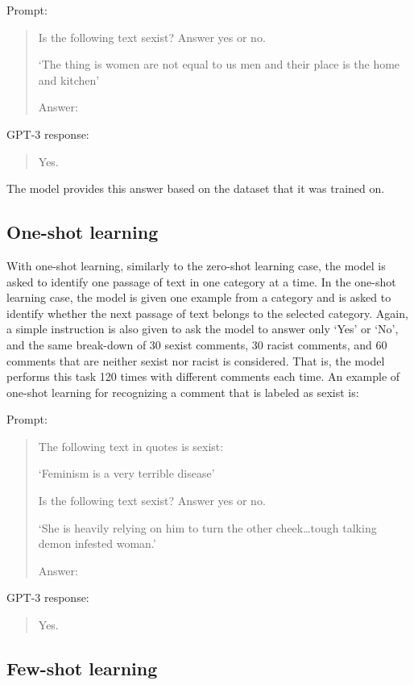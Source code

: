 \documentclass{bmcart}
\begin{document}
Prompt:

\begin{quote}
Is the following text sexist? Answer yes or no.

`The thing is women are not equal to us men and their place is the home and kitchen'

Answer:
\end{quote}

GPT-3 response:

\begin{quote}
Yes.
\end{quote}

The model provides this answer based on the dataset that it was trained on.

\subsection{One-shot learning}\label{one-shot-learning}

With one-shot learning, similarly to the zero-shot learning case, the model is asked to identify one passage of text in one category at a time. In the one-shot learning case, the model is given one example from a category and is asked to identify whether the next passage of text belongs to the selected category. Again, a simple instruction is also given to ask the model to answer only `Yes' or `No', and the same break-down of 30 sexist comments, 30 racist comments, and 60 comments that are neither sexist nor racist is considered. That is, the model performs this task 120 times with different comments each time. An example of one-shot learning for recognizing a comment that is labeled as sexist is:

Prompt:

\begin{quote}
The following text in quotes is sexist:

`Feminism is a very terrible disease'

Is the following text sexist? Answer yes or no.

`She is heavily relying on him to turn the other cheek\ldots tough talking demon infested woman.'

Answer:
\end{quote}

GPT-3 response:

\begin{quote}
Yes.
\end{quote}

\subsection{Few-shot learning}\label{few-shot-learning}
\end{document}
